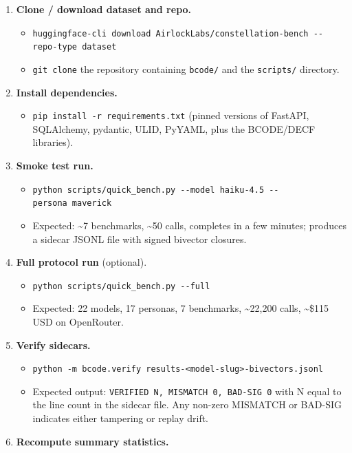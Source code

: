 \begin{enumerate}
\def\labelenumi{\arabic{enumi}.}
\tightlist
\item
  \textbf{Clone / download dataset and repo.}

  \begin{itemize}
  \tightlist
  \item
    \texttt{huggingface-cli\ download\ AirlockLabs/constellation-bench\ -\/-repo-type\ dataset}
  \item
    \texttt{git\ clone} the repository containing \texttt{bcode/} and
    the \texttt{scripts/} directory.
  \end{itemize}
\item
  \textbf{Install dependencies.}

  \begin{itemize}
  \tightlist
  \item
    \texttt{pip\ install\ -r\ requirements.txt} (pinned versions of
    FastAPI, SQLAlchemy, pydantic, ULID, PyYAML, plus the BCODE/DECF
    libraries).
  \end{itemize}
\item
  \textbf{Smoke test run.}

  \begin{itemize}
  \tightlist
  \item
    \texttt{python\ scripts/quick\_bench.py\ -\/-model\ haiku-4.5\ -\/-persona\ maverick}
  \item
    Expected: \textasciitilde7 benchmarks, \textasciitilde50 calls,
    completes in a few minutes; produces a sidecar JSONL file with
    signed bivector closures.
  \end{itemize}
\item
  \textbf{Full protocol run} (optional).

  \begin{itemize}
  \tightlist
  \item
    \texttt{python\ scripts/quick\_bench.py\ -\/-full}
  \item
    Expected: 22 models, 17 personas, 7 benchmarks,
    \textasciitilde22,200 calls, \textasciitilde\$115 USD on OpenRouter.
  \end{itemize}
\item
  \textbf{Verify sidecars.}

  \begin{itemize}
  \tightlist
  \item
    \texttt{python\ -m\ bcode.verify\ results-\textless{}model-slug\textgreater{}-bivectors.jsonl}
  \item
    Expected output: \texttt{VERIFIED\ N,\ MISMATCH\ 0,\ BAD-SIG\ 0}
    with N equal to the line count in the sidecar file. Any non-zero
    MISMATCH or BAD-SIG indicates either tampering or replay drift.
  \end{itemize}
\item
  \textbf{Recompute summary statistics.}


\end{enumerate}
